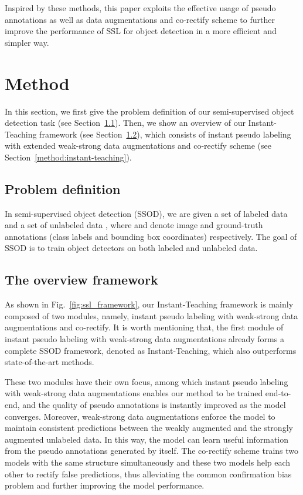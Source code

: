 \documentclass[final]{cvpr}
\begin{document}
Inspired by these methods, this paper exploits the effective usage of pseudo annotations as well as data augmentations and co-rectify scheme to further improve the performance of SSL for object detection in a more efficient and simpler way.




\section{Method}

In this section, we first give the problem definition of our semi-supervised object detection task (see Section~\ref{method:probdef}). Then, we show an overview of our Instant-Teaching framework (see Section~\ref{method:tof}), which consists of instant pseudo labeling with extended weak-strong data augmentations and co-rectify scheme (see Section~\ref{method:instant-teaching}).


\subsection{Problem definition}
\label{method:probdef}
In semi-supervised object detection (SSOD), we are given a set of labeled data  and a set of unlabeled data , where  and  denote image and ground-truth annotations (class labels and bounding box coordinates) respectively. The goal of SSOD is to train object detectors on both labeled and unlabeled data.


\subsection{The overview framework}
\label{method:tof}

As shown in Fig.~\ref{fig:ssl_framework}, our Instant-Teaching framework is mainly composed of two modules, namely, instant pseudo labeling with weak-strong data augmentations and co-rectify.
It is worth mentioning that, the first module of instant pseudo labeling with weak-strong data augmentations already forms a complete SSOD framework, denoted as Instant-Teaching, which also outperforms state-of-the-art methods.

These two modules have their own focus, among which instant pseudo labeling with weak-strong data augmentations enables our method to be trained end-to-end, and the quality of pseudo annotations is instantly improved as the model converges.
Moreover, weak-strong data augmentations enforce the model to maintain consistent predictions between the weakly augmented and the strongly augmented unlabeled data. In this way, the model can learn useful information from the pseudo annotations generated by itself. The co-rectify scheme trains two models with the same structure simultaneously and these two models help each other to rectify false predictions, thus alleviating the common confirmation bias problem and further improving the model performance.
\end{document}
